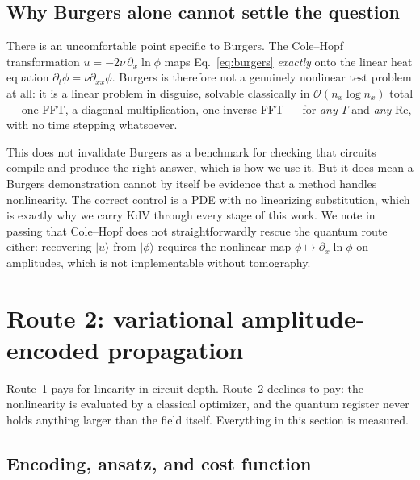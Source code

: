 \documentclass[aps,prx,twocolumn,notitlepage,superscriptaddress,floatfix,10pt]{revtex4-2}
\renewcommand{\ket}[1]{\lvert #1 \rangle}
\newcommand{\Rey}{\mathrm{Re}}
\newcommand{\Oh}{\mathcal{O}}
\begin{document}
\subsection{Why Burgers alone cannot settle the question}
\label{sec:colehopf}

There is an uncomfortable point specific to Burgers. The Cole--Hopf transformation
$u=-2\nu\,\partial_x\ln\phi$ maps Eq.~\eqref{eq:burgers} \emph{exactly} onto the linear heat equation
$\partial_t\phi=\nu\partial_{xx}\phi$. Burgers is therefore not a genuinely nonlinear test problem at
all: it is a linear problem in disguise, solvable classically in $\Oh(n_x\log n_x)$ total --- one FFT, a
diagonal multiplication, one inverse FFT --- for \emph{any} $T$ and \emph{any} $\Rey$, with no time
stepping whatsoever.

This does not invalidate Burgers as a benchmark for checking that circuits compile and produce the
right answer, which is how we use it. But it does mean a Burgers demonstration cannot by itself be
evidence that a method handles nonlinearity. The correct control is a PDE with no linearizing
substitution, which is exactly why we carry KdV through every stage of this work. We note in passing
that Cole--Hopf does not straightforwardly rescue the quantum route either: recovering $\ket{u}$ from
$\ket{\phi}$ requires the nonlinear map $\phi\mapsto\partial_x\ln\phi$ on amplitudes, which is not
implementable without tomography.

\section{Route 2: variational amplitude-encoded propagation}
\label{sec:variational}

Route~1 pays for linearity in circuit depth. Route~2 declines to pay: the nonlinearity is evaluated
by a classical optimizer, and the quantum register never holds anything larger than the field itself.
Everything in this section is measured.

\subsection{Encoding, ansatz, and cost function}
\end{document}
